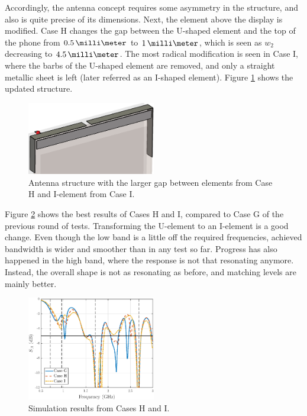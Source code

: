 Accordingly, the antenna concept requires some asymmetry in the structure, and also is quite precise of its dimensions. Next, the element above the display is modified. Case H changes the gap between the U-shaped element and the top of the phone from $0.5\,\milli\meter$ to $1\,\milli\meter$, which is seen as $w_2$ decreasing to $4.5\,\milli\meter$. The most radical modification is seen in Case I, where the barbs of the U-shaped element are removed, and only a straight metallic sheet is left (later referred as an I-shaped element). Figure \ref{fig:concept_i_shape} shows the updated structure.
\begin{figure}[H]
    \centering
    \includegraphics[width=0.5\textwidth]{img/concept_i_shape.eps}
    \caption{Antenna structure with the larger gap between elements from Case H and I-element from Case I.}
    \label{fig:concept_i_shape}
\end{figure}

Figure \ref{fig:concept4} shows the best results of Cases H and I, compared to Case G of the previous round of tests. Transforming the U-element to an I-element is a good change. Even though the low band is a little off the required frequencies, achieved bandwidth is wider and smoother than in any test so far. Progress has also happened in the high band, where the response is not that resonating anymore. Instead, the overall shape is not as resonating as before, and matching levels are mainly better.
\begin{figure}[H]
    \centering
    \includegraphics[width=0.5\textwidth]{img/concept4.eps}
    \caption{Simulation results from Cases H and I.}
    \label{fig:concept4}
    \vspace{-12pt}
\end{figure}

